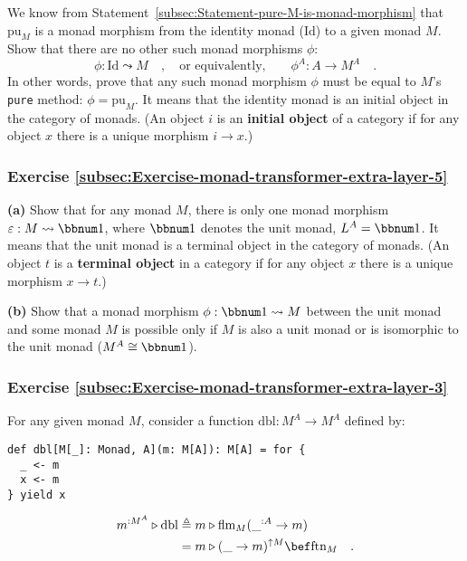 We know from Statement~\ref{subsec:Statement-pure-M-is-monad-morphism}
that $\text{pu}_{M}$ is a monad morphism from the identity monad
($\text{Id}$) to a given monad $M$. Show that there are no other
such monad morphisms $\phi$:
\[
\phi:\text{Id}\leadsto M\quad,\quad\text{or equivalently,}\quad\quad\phi^{A}:A\rightarrow M^{A}\quad.
\]
In other words, prove that any such monad morphism $\phi$ must be
equal to $M$\textsf{'}s \lstinline!pure! method: $\phi=\text{pu}_{M}$. It
means that the identity monad is an initial object
in the category of monads. (An object $i$ is an \textbf{initial object}
of a category if for any object $x$ there is a unique morphism $i\rightarrow x$.)

\subsubsection{Exercise \label{subsec:Exercise-monad-transformer-extra-layer-5}\ref{subsec:Exercise-monad-transformer-extra-layer-5}}

\textbf{(a)} Show that for any monad $M$, there is only one monad
morphism $\varepsilon:M\leadsto\bbnum 1$, where $\bbnum 1$ denotes
the unit monad, $L^{A}=\bbnum 1$. It means that the unit monad is
a terminal object in the category of monads. (An object $t$ is a
\textbf{terminal object} in a category if for any object $x$ there
is a unique morphism $x\rightarrow t$.)

\textbf{(b)} Show that a monad morphism $\phi:\bbnum 1\leadsto M$
between the unit monad and some monad $M$ is possible only if $M$
is also a unit monad or is isomorphic to the unit monad ($M^{A}\cong\bbnum 1$).

\subsubsection{Exercise \label{subsec:Exercise-monad-transformer-extra-layer-3}\ref{subsec:Exercise-monad-transformer-extra-layer-3}}

For any given monad $M$, consider a function $\text{dbl}:M^{A}\rightarrow M^{A}$
defined by:
\begin{lstlisting}
def dbl[M[_]: Monad, A](m: M[A]): M[A] = for {
  _ <- m
  x <- m
} yield x
\end{lstlisting}
\begin{align*}
m^{:M^{A}}\triangleright\text{dbl} & \triangleq m\triangleright\text{flm}_{M}(\_^{:A}\rightarrow m)\\
 & =m\triangleright(\_\rightarrow m)^{\uparrow M}\bef\text{ftn}_{M}\quad.
\end{align*}

